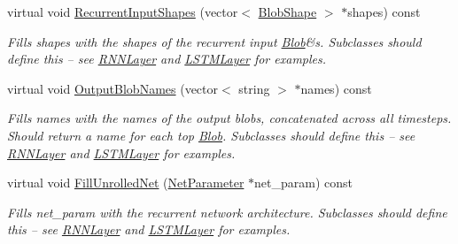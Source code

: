 \begin{DoxyCompactItemize}
\mbox{\label{classcaffe_1_1_l_s_t_m_layer_ab3978704db58d6f2a43d3cfccec9853b}} 
virtual void \mbox{\hyperlink{classcaffe_1_1_l_s_t_m_layer_ab3978704db58d6f2a43d3cfccec9853b}{Recurrent\+Input\+Shapes}} (vector$<$ \mbox{\hyperlink{classcaffe_1_1_blob_shape}{Blob\+Shape}} $>$ $\ast$shapes) const
\begin{DoxyCompactList}\small\item\em Fills shapes with the shapes of the recurrent input \mbox{\hyperlink{classcaffe_1_1_blob}{Blob}}\&s. Subclasses should define this -- see \mbox{\hyperlink{classcaffe_1_1_r_n_n_layer}{R\+N\+N\+Layer}} and \mbox{\hyperlink{classcaffe_1_1_l_s_t_m_layer}{L\+S\+T\+M\+Layer}} for examples. \end{DoxyCompactList}\item 
\mbox{\label{classcaffe_1_1_l_s_t_m_layer_a86acb620f5a10c6caa2661398e0b4f5a}} 
virtual void \mbox{\hyperlink{classcaffe_1_1_l_s_t_m_layer_a86acb620f5a10c6caa2661398e0b4f5a}{Output\+Blob\+Names}} (vector$<$ string $>$ $\ast$names) const
\begin{DoxyCompactList}\small\item\em Fills names with the names of the output blobs, concatenated across all timesteps. Should return a name for each top \mbox{\hyperlink{classcaffe_1_1_blob}{Blob}}. Subclasses should define this -- see \mbox{\hyperlink{classcaffe_1_1_r_n_n_layer}{R\+N\+N\+Layer}} and \mbox{\hyperlink{classcaffe_1_1_l_s_t_m_layer}{L\+S\+T\+M\+Layer}} for examples. \end{DoxyCompactList}\item 
\mbox{\label{classcaffe_1_1_l_s_t_m_layer_ad366d5d814f1c77355d51e83a0eb72f0}} 
virtual void \mbox{\hyperlink{classcaffe_1_1_l_s_t_m_layer_ad366d5d814f1c77355d51e83a0eb72f0}{Fill\+Unrolled\+Net}} (\mbox{\hyperlink{classcaffe_1_1_net_parameter}{Net\+Parameter}} $\ast$net\+\_\+param) const
\begin{DoxyCompactList}\small\item\em Fills net\+\_\+param with the recurrent network architecture. Subclasses should define this -- see \mbox{\hyperlink{classcaffe_1_1_r_n_n_layer}{R\+N\+N\+Layer}} and \mbox{\hyperlink{classcaffe_1_1_l_s_t_m_layer}{L\+S\+T\+M\+Layer}} for examples. \end{DoxyCompactList}\item 

\end{DoxyCompactItemize}

